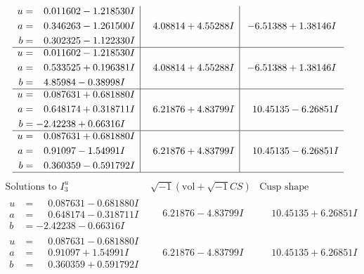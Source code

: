 \documentclass[1p]{elsarticle_modified}
\theoremstyle{definition}
\newcommand{\I}{\sqrt{-1}}
\begin{document}
$$\begin{array}{c|c|c}
\begin{aligned}
u &= \phantom{-}0.011602 - 1.218530 I \\
a &= \phantom{-}0.346263 - 1.261500 I \\
b &= \phantom{-}0.302325 - 1.122330 I\end{aligned}
 & \phantom{-}4.08814 + 4.55288 I & -6.51388 + 1.38146 I \\ \hline\begin{aligned}
u &= \phantom{-}0.011602 - 1.218530 I \\
a &= \phantom{-}0.533525 + 0.196381 I \\
b &= \phantom{-}4.85984 - 0.38998 I\end{aligned}
 & \phantom{-}4.08814 + 4.55288 I & -6.51388 + 1.38146 I \\ \hline\begin{aligned}
u &= \phantom{-}0.087631 + 0.681880 I \\
a &= \phantom{-}0.648174 + 0.318711 I \\
b &= -2.42238 + 0.66316 I\end{aligned}
 & \phantom{-}6.21876 + 4.83799 I & \phantom{-}10.45135 - 6.26851 I \\ \hline\begin{aligned}
u &= \phantom{-}0.087631 + 0.681880 I \\
a &= \phantom{-}0.91097 - 1.54991 I \\
b &= \phantom{-}0.360359 - 0.591792 I\end{aligned}
 & \phantom{-}6.21876 + 4.83799 I & \phantom{-}10.45135 - 6.26851 I\\
 \hline 
 \end{array}$$\newpage$$\begin{array}{c|c|c}  
\text{Solutions to }I^u_{3}& \I (\text{vol} + \sqrt{-1}CS) & \text{Cusp shape}\\
 \hline 
\begin{aligned}
u &= \phantom{-}0.087631 - 0.681880 I \\
a &= \phantom{-}0.648174 - 0.318711 I \\
b &= -2.42238 - 0.66316 I\end{aligned}
 & \phantom{-}6.21876 - 4.83799 I & \phantom{-}10.45135 + 6.26851 I \\ \hline\begin{aligned}
u &= \phantom{-}0.087631 - 0.681880 I \\
a &= \phantom{-}0.91097 + 1.54991 I \\
b &= \phantom{-}0.360359 + 0.591792 I\end{aligned}
 & \phantom{-}6.21876 - 4.83799 I & \phantom{-}10.45135 + 6.26851 I \\ \hline\begin{aligned}

\end{aligned}
\end{array}$$
\end{document}
